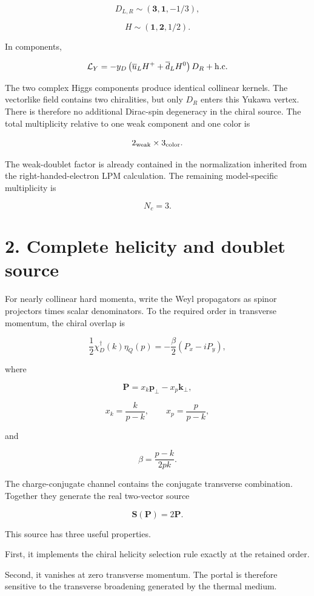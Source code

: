 \documentclass[
  10pt,
]{article}
\begin{document}
\[
D_{L,R}\sim(\mathbf 3,\mathbf 1,-1/3),
\]

\[
H\sim(\mathbf 1,\mathbf 2,1/2).
\]

In components,

\[
\mathcal L_Y
=
-y_D
\left(
\overline u_L H^+
+
\overline d_L H^0
\right)D_R
+{\rm h.c.}
\]

The two complex Higgs components produce identical collinear kernels.
The vectorlike field contains two chiralities, but only \(D_R\) enters
this Yukawa vertex. There is therefore no additional Dirac-spin
degeneracy in the chiral source. The total multiplicity relative to one
weak component and one color is

\[
2_{\rm weak}\times3_{\rm color}.
\]

The weak-doublet factor is already contained in the normalization
inherited from the right-handed-electron LPM calculation. The remaining
model-specific multiplicity is

\[
N_c=3.
\]

\section{2. Complete helicity and doublet
source}\label{complete-helicity-and-doublet-source}

For nearly collinear hard momenta, write the Weyl propagators as spinor
projectors times scalar denominators. To the required order in
transverse momentum, the chiral overlap is

\[
\frac12
\chi_D^\dagger(k)\eta_Q(p)
=
-\frac{\beta}{2}
(P_x-iP_y),
\]

where

\[
\mathbf P
=
x_k\mathbf p_\perp-x_p\mathbf k_\perp,
\]

\[
x_k=\frac{k}{p-k},
\qquad
x_p=\frac{p}{p-k},
\]

and

\[
\beta=\frac{p-k}{2pk}.
\]

The charge-conjugate channel contains the conjugate transverse
combination. Together they generate the real two-vector source

\[
\boxed{
\mathbf S(\mathbf P)=2\mathbf P.
}
\]

This source has three useful properties.

First, it implements the chiral helicity selection rule exactly at the
retained order.

Second, it vanishes at zero transverse momentum. The portal is therefore
sensitive to the transverse broadening generated by the thermal medium.
\end{document}
